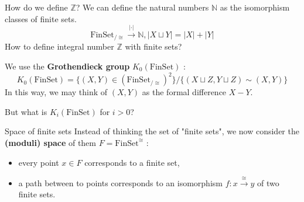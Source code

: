 \documentclass[12pt]{beamer}
\begin{document}
\begin{frame}{How do we define $\mathbb{Z}$?}
\pause
We can define the natural numbers $\mathbb{N}$ as the isomorphism classes of finite sets.
\[
  \mathrm{FinSet}_{/\cong} \xrightarrow{|\cdot|} \mathbb{N}, |X \sqcup Y| = |X|+|Y| 
\]
How to define integral number $\mathbb{Z}$ with finite sets? 

\pause
We use the \textbf{Grothendieck group} $K_0(\mathrm{FinSet})$ :
\[
  K_0(\mathrm{FinSet}) = \{ (X,Y)\in (\mathrm{FinSet}_{/\cong})^2   \} / \{ (X \sqcup Z , Y \sqcup Z) \sim (X,Y)\}
\]
In this way, we may think of $(X,Y)$ as the formal difference $X-Y$.

\pause
But what is $K_i(\mathrm{FinSet})$ for $i>0$?
\end{frame}
\begin{frame}{Space of finite sets}
  Instead of thinking the set of "finite sets", we now consider the \textbf{(moduli) space} of them $F = \mathrm{FinSet}^{\cong}$ : 
  \begin{itemize}
    \item every point $x\in F$ corresponds to a finite set,
    \item a path between to points corresponds to an isomorphism $f:x\xrightarrow{\cong} y$ of two finite sets.
  \end{itemize}
  \pause

\begin{center}


\begin{tikzpicture}[x=0.75pt,y=0.75pt,yscale=-1,xscale=1]


\end{tikzpicture}
\end{center}
\end{frame}
\end{document}
